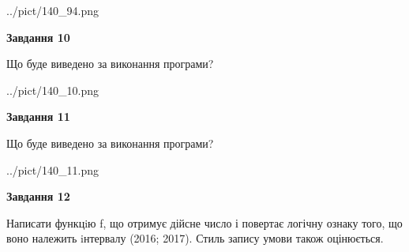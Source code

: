 \documentclass[12pt, ukrainian]{article}
\begin{document}
{\begin {large}
\begin{center}
	{../pict/140_94.png}
\end{center}
\newpage

{\begin {center}\textbf{Завдання 10}\end {center}}

Що буде виведено за виконання програми?\par
\begin{center}
	{../pict/140_10.png}
\end{center}
\newpage

{\begin {center}\textbf{Завдання 11}\end {center}}

Що буде виведено за виконання програми?\par
\begin{center}
	{../pict/140_11.png}
\end{center}
\newpage

{\begin {center}\textbf{Завдання 12}\end {center}}


Написати функцiю f, що отримує дійсне число і повертає логічну ознаку того, що воно належить iнтервалу (2016; 2017). Стиль запису умови також оцінюється.\par
\newpage

\end {large}}
\end{document}
